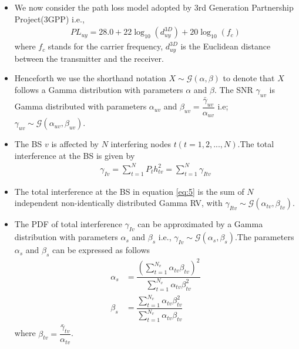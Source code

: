 \documentclass{beamer}
\begin{document}
\begin{frame}{}
 \begin{itemize}
     \item We now consider the path loss model adopted by 3rd Generation Partnership Project(3GPP) i.e.,
     \begin{align}
         PL_{uy} = 28.0 + 22\log_{10}(d^{3D}_{uy}) + 20\log_{10}(f_{c})\label{eq:4}
     \end{align}
     where $f_{c}$ stands for the carrier frequency, $d^{3D}_{uy}$ is the Euclidean distance between the transmitter and the receiver.
     \item Henceforth we use the shorthand notation $X \sim 
       \mathscr{G}(\alpha,\beta)$ to denote that $X$ follows a Gamma distribution with parameters $\alpha$ and $\beta$. The SNR $\gamma_{uv}$ is Gamma distributed with parameters $\alpha_{uv}$ and $\beta_{uv} = \dfrac{\bar{\gamma}_{uv}}{\alpha_{uv}}$ i.e; $\gamma_{uv} \sim \mathscr{G}(\alpha_{uv},\beta_{uv})$.
       \item The BS $v$ is affected by $N$ interfering nodes $t(t=1,2,...,N)$.The total interference at the BS is given by
       \begin{align}
    \gamma_{Iv} = \sum_{t=1}^{N}P_{t}h_{tv}^2 = \sum_{t=1}^{N}\gamma_{Itv}\label{eq:5}
       \end{align}
 \end{itemize}   
\end{frame}

\begin{frame}{}
\begin{itemize}
    \item The total interference at the BS in equation \eqref{eq:5} is the sum of $N$ independent non-identically distributed Gamma RV, with $\gamma_{Itv} \sim \mathscr{G}(\alpha_{tv},\beta_{tv})$.
    \item The PDF of total interference $\gamma_{Iv}$ can be approximated by a Gamma distribution with parameters $\alpha_{s}$ and $\beta_{s}$ i.e., $\gamma_{Iv} \sim \mathscr{G}(\alpha_{s},\beta_{s})$.The parameters $\alpha_{s}$ and $\beta_{s}$ can be expressed as follows
    \begin{align}
        \alpha_{s} &= \dfrac{(\sum_{t=1}^{N_{v}}\alpha_{tv}\beta_{tv})^2}{\sum_{t=1}^{N_{v}}\alpha_{tv}\beta_{tv}^2}\label{eq:6}\\
        \beta_{s} &= \dfrac{\sum_{t=1}^{N_{v}}\alpha_{tv}\beta_{tv}^2}{\sum_{t=1}^{N_{v}}\alpha_{tv}\beta_{tv}}\label{eq:7} 
    \end{align}
    where $\beta_{tv} = \dfrac{\bar{\gamma}_{tv}}{\alpha_{tv}}$.
\end{itemize}
\end{frame}
\end{document}
